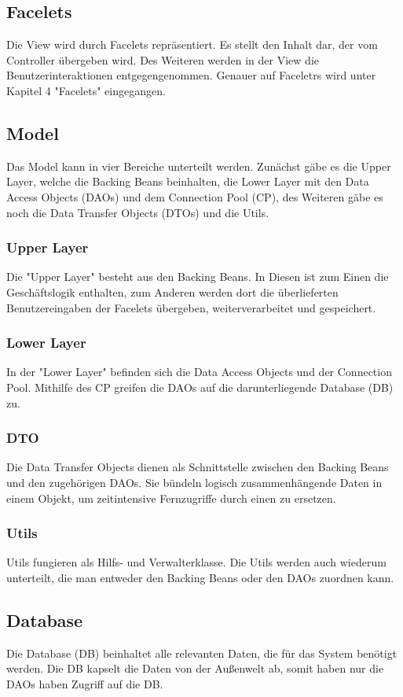     \subsection{Facelets}
    	Die View wird durch Facelets repräsentiert. Es stellt den Inhalt dar, der vom Controller übergeben wird. Des Weiteren werden in der View die Benutzerinteraktionen entgegengenommen. Genauer auf Faceletrs wird unter Kapitel 4 "Facelets" eingegangen.
   	\subsection{Model}
   	Das Model kann in vier Bereiche unterteilt werden. Zunächst gäbe es die Upper Layer, welche die Backing Beans beinhalten, die Lower Layer mit den Data Access Objects (DAOs) und dem Connection Pool (CP), des Weiteren gäbe es noch die Data Transfer Objects (DTOs) und die Utils. 
   		\subsubsection{Upper Layer}
   		Die "Upper Layer" besteht aus den Backing Beans. In Diesen ist zum Einen die Geschäftslogik enthalten, zum Anderen werden dort die überlieferten Benutzereingaben der Facelets übergeben, weiterverarbeitet und gespeichert.
    	\subsubsection{Lower Layer}
    	In der "Lower Layer" befinden sich die Data Access Objects und der Connection Pool. Mithilfe des CP greifen die DAOs auf die darunterliegende Database (DB) zu.
    	\subsubsection{DTO}
    	Die Data Transfer Objects dienen als Schnittstelle zwischen den Backing Beans und den zugehörigen DAOs. Sie bündeln logisch zusammenhängende Daten in einem Objekt, um zeitintensive Fernzugriffe durch einen zu ersetzen.
    	\subsubsection{Utils}
    	Utils fungieren als Hilfs- und Verwalterklasse. Die Utils werden auch wiederum unterteilt, die man entweder den Backing Beans oder den DAOs zuordnen kann. 
    \subsection{Database}
    Die Database (DB) beinhaltet alle relevanten Daten, die für das System benötigt werden. Die DB kapselt die Daten von der Außenwelt ab, somit haben nur die DAOs haben Zugriff auf die DB. 
